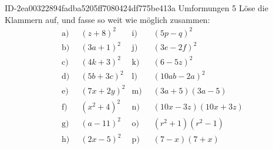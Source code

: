 \begin{exercise}
      {ID-2ea00322894fadba5205ff7080424df775be413a}
      {Umformungen 5}
  \ifproblem\problem
    \newcommand{\gap}{\;\;}%
    Löse die Klammern auf, und fasse so weit wie möglich zusammen:
    \begin{align*}
      \text{a)}\gap & (z+8)^2 &
      \text{i)}\gap & (5p-q)^2
      \\
      \text{b)}\gap & (3a+1)^2 &
      \text{j)}\gap & (3e-2f)^2
      \\
      \text{c)}\gap & (4k+3)^2 &
      \text{k)}\gap & (6-5z)^2
      \\
      \text{d)}\gap & (5b+3c)^2 &
      \text{l)}\gap & (10ab-2a)^2
      \\
      \text{e)}\gap & (7x+2y)^2 &
      \text{m)}\gap & (3a+5)(3a-5)
      \\
      \text{f)}\gap & (x^2+4)^2 &
      \text{n)}\gap & (10x-3z)(10x+3z)
      \\
      \text{g)}\gap & (a-11)^2 &
      \text{o)}\gap & (r^2+1)(r^2-1)
      \\
      \text{h)}\gap & (2x-5)^2 &
      \text{p)}\gap & (7-x)(7+x)
    \end{align*}
  \fi
  \ifoutcome\outcome
    \newcommand{\toprow}[1]
    {%
      \makebox[20em][l]
      {%
        \ensuremath
        {%
          \displaystyle
          \phantom{\,=\:\,}%
          #1%
        }%
      }%
    }%

    \newcommand{\solutionA} { \text{a)}&\quad &          (z+8)^2&=z^2+16z+256           }
    \newcommand{\solutionB} { \text{b)}&\quad &         (3a+1)^2&=9a^2+6a+1             }
    \newcommand{\solutionC} { \text{c)}&\quad &         (4k+3)^2&=16k^2+24k+9           }
    \newcommand{\solutionD} { \text{d)}&\quad &        (5b+3c)^2&=25b^2+30bc+9c^2       }
    \newcommand{\solutionE} { \text{e)}&\quad &        (7x+2y)^2&=49x^2+28xy+4y^2       }
    \newcommand{\solutionF} { \text{f)}&\quad &        (x^2+4)^2&=x^4+8x^2+16           }
    \newcommand{\solutionG} { \text{g)}&\quad &         (a-11)^2&=a^2-22a+121           }
    \newcommand{\solutionH} { \text{h)}&\quad &         (2x-5)^2&=4x^2-20x+25           }
    \newcommand{\solutionI} { \text{i)}&\quad &         (5p-q)^2&=25p^2-10pq+q^2        }
    \newcommand{\solutionJ} { \text{j)}&\quad &        (3e-2f)^2&=9e^2-12ef+4f^2        }
    \newcommand{\solutionK} { \text{k)}&\quad &         (6-5z)^2&=36-60z+25z^2          }
    \newcommand{\solutionL} { \text{l)}&\quad &      (10ab-2a)^2&=100a^2b^2-40a^2b+4a^2 }
    \newcommand{\solutionM} { \text{m)}&\quad &     (3a+5)(3a-5)&=9a^2-25               }
    \newcommand{\solutionN} { \text{n)}&\quad & (10x-3z)(10x+3z)&=100x^2-9z^2           }
    \newcommand{\solutionO} { \text{o)}&\quad &   (r^2+1)(r^2-1)&=r^4-1                 }
    \newcommand{\solutionP} { \text{p)}&\quad &       (7-x)(7+x)&=49-x^2                }


\end{exercise}
